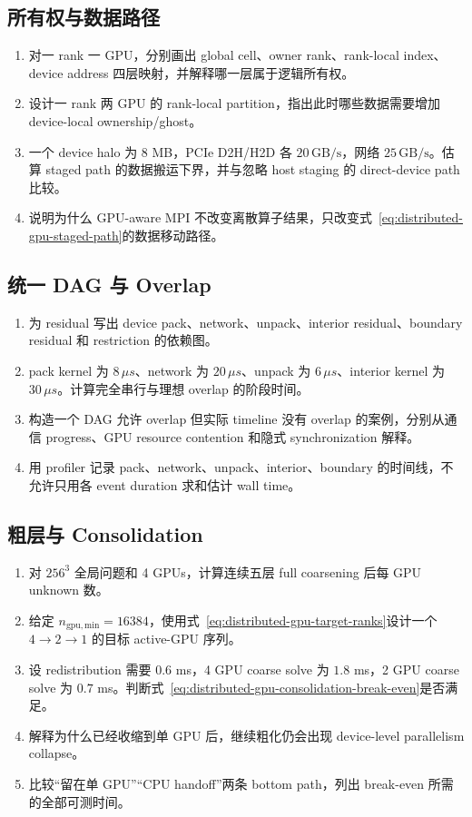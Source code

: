 \subsection*{所有权与数据路径}
\begin{enumerate}[label=\arabic*.]
\item 对一 rank 一 GPU，分别画出 global cell、owner rank、rank-local index、device address 四层映射，并解释哪一层属于逻辑所有权。
\item 设计一 rank 两 GPU 的 rank-local partition，指出此时哪些数据需要增加 device-local ownership/ghost。
\item 一个 device halo 为 8 MB，PCIe D2H/H2D 各 $20\,\mathrm{GB/s}$，网络 $25\,\mathrm{GB/s}$。估算 staged path 的数据搬运下界，并与忽略 host staging 的 direct-device path 比较。
\item 说明为什么 GPU-aware MPI 不改变离散算子结果，只改变式~\eqref{eq:distributed-gpu-staged-path}的数据移动路径。
\end{enumerate}

\subsection*{统一 DAG 与 Overlap}
\begin{enumerate}[label=\arabic*.]
\item 为 residual 写出 device pack、network、unpack、interior residual、boundary residual 和 restriction 的依赖图。
\item pack kernel 为 $8\,\mu s$、network 为 $20\,\mu s$、unpack 为 $6\,\mu s$、interior kernel 为 $30\,\mu s$。计算完全串行与理想 overlap 的阶段时间。
\item 构造一个 DAG 允许 overlap 但实际 timeline 没有 overlap 的案例，分别从通信 progress、GPU resource contention 和隐式 synchronization 解释。
\item 用 profiler 记录 pack、network、unpack、interior、boundary 的时间线，不允许只用各 event duration 求和估计 wall time。
\end{enumerate}

\subsection*{粗层与 Consolidation}
\begin{enumerate}[label=\arabic*.]
\item 对 $256^3$ 全局问题和 4 GPUs，计算连续五层 full coarsening 后每 GPU unknown 数。
\item 给定 $n_{\mathrm{gpu,min}}=16384$，使用式~\eqref{eq:distributed-gpu-target-ranks}设计一个 $4\rightarrow2\rightarrow1$ 的目标 active-GPU 序列。
\item 设 redistribution 需要 $0.6$ ms，4 GPU coarse solve 为 $1.8$ ms，2 GPU coarse solve 为 $0.7$ ms。判断式~\eqref{eq:distributed-gpu-consolidation-break-even}是否满足。
\item 解释为什么已经收缩到单 GPU 后，继续粗化仍会出现 device-level parallelism collapse。
\item 比较“留在单 GPU”“CPU handoff”两条 bottom path，列出 break-even 所需的全部可测时间。
\end{enumerate}

